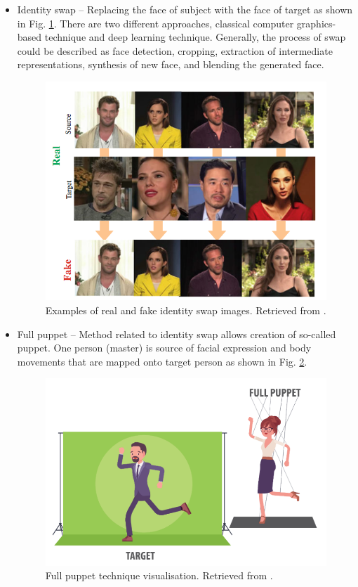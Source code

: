 \begin{itemize}
\item Identity swap – Replacing the face of subject with the face of target as shown in Fig. \ref{fig:idenity_swap}. There are two different approaches, classical computer graphics-based technique and deep learning technique. Generally, the process of swap could be described as face detection, cropping, extraction of intermediate representations, synthesis of new face, and blending the generated face.
\begin{figure}[H]
    \centering
    \includegraphics[width=.53\linewidth]{other-fig/idenity_swap.png}        
    \caption{Examples of real and fake identity swap images. Retrieved from \cite{IntroductionToDigitalFaceManipulation}.}
\label{fig:idenity_swap}
\end{figure}

\item Full puppet – Method related to identity swap allows creation of so-called puppet. One person (master) is source of facial expression and body movements that are mapped onto target person as shown in Fig. \ref{fig:full_puppet}. \cite{IncreasingThreatofDeepfakeIdentites}
\begin{figure}[H]
    \centering
    \includegraphics[width=.41\linewidth]{other-fig/full_puppet.png}        
    \caption{Full puppet technique visualisation. Retrieved from \cite{TheThreatOfDeepfakes}.}
\label{fig:full_puppet}
\end{figure}


\end{itemize}
